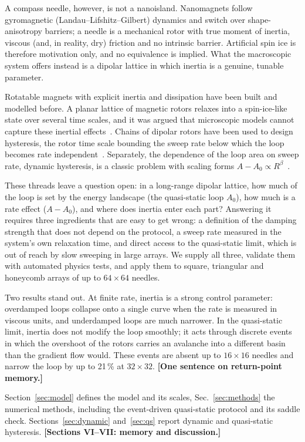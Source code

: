 \documentclass[pre,twocolumn,superscriptaddress,showpacs,floatfix]{revtex4-2}
\newcommand{\todo}[1]{\textcolor{red!70!black}{\textbf{[#1]}}}
\begin{document}
A compass needle, however, is not a nanoisland. Nanomagnets follow gyromagnetic (Landau--Lifshitz--Gilbert) dynamics and switch over shape-anisotropy barriers; a needle is a mechanical rotor with true moment of inertia, viscous (and, in reality, dry) friction and no intrinsic barrier. Artificial spin ice is therefore motivation only, and no equivalence is implied. What the macroscopic system offers instead is a dipolar lattice in which inertia is a genuine, tunable parameter.

Rotatable magnets with explicit inertia and dissipation have been built and modelled before. A planar lattice of magnetic rotors relaxes into a spin-ice-like state over several time scales, and it was argued that microscopic models cannot capture these inertial effects~\cite{mellado2012}. Chains of dipolar rotors have been used to design hysteresis, the rotor time scale bounding the sweep rate below which the loop becomes rate independent~\cite{concha2017}. Separately, the dependence of the loop area on sweep rate, dynamic hysteresis, is a classic problem with scaling forms $A-A_0\propto R^\beta$~\cite{rao1990}.

These threads leave a question open: in a long-range dipolar lattice, how much of the loop is set by the energy landscape (the quasi-static loop $A_0$), how much is a rate effect ($A-A_0$), and where does inertia enter each part? Answering it requires three ingredients that are easy to get wrong: a definition of the damping strength that does not depend on the protocol, a sweep rate measured in the system's own relaxation time, and direct access to the quasi-static limit, which is out of reach by slow sweeping in large arrays. We supply all three, validate them with automated physics tests, and apply them to square, triangular and honeycomb arrays of up to $64\times64$ needles.

Two results stand out. At finite rate, inertia is a strong control parameter: overdamped loops collapse onto a single curve when the rate is measured in viscous units, and underdamped loops are much narrower. In the quasi-static limit, inertia does not modify the loop smoothly; it acts through discrete events in which the overshoot of the rotors carries an avalanche into a different basin than the gradient flow would. These events are absent up to $16\times16$ needles and narrow the loop by up to 21\,\% at $32\times32$. \todo{One sentence on return-point memory.}

Section~\ref{sec:model} defines the model and its scales, Sec.~\ref{sec:methods} the numerical methods, including the event-driven quasi-static protocol and its saddle check. Sections~\ref{sec:dynamic} and~\ref{sec:qs} report dynamic and quasi-static hysteresis. \todo{Sections VI--VII: memory and discussion.}
\end{document}
